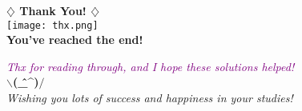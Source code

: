 \documentclass[12pt]{article}
\begin{document}
\pagebreak

\begin{tcolorbox}[colframe=purple!70!red, colback=white, sharp corners=southwest, boxrule=2mm]
    \begin{center}
        \textbf{\huge \textcolor{purple!70!red}{\(\diamondsuit\) Thank You! \(\diamondsuit\)}}\\[1em]
        \texttt{[image: thx.png]} \\
        \vspace{1em}
        \textbf{\LARGE You've reached the end!}
    \end{center}

    \vspace{1.5em}

    \begin{center}
        \textcolor{purple}{\textit{Thx for reading through, and I hope these solutions helped!}}\\[0.5em]
        \textbf{\Huge $\backslash$(\^\_\^{})$/$} \\
        \vspace{1em}
        \textit{Wishing you lots of success and happiness in your studies!}
    \end{center}

    \vspace{2em}
\end{tcolorbox}
\end{document}

